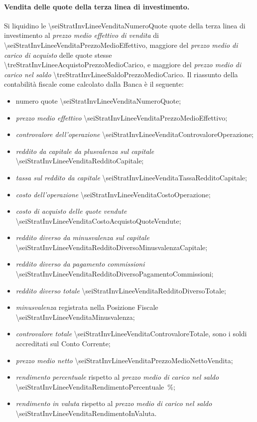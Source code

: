 \documentclass[12pt,a4paper]{article}
\newcommand{\Eur}[1]{\SI{#1}{\text{\euro{}}}}
\begin{document}
\paragraph{Vendita delle quote della terza linea di investimento.}
Si liquidino le \num{\seiStratInvLineeVenditaNumeroQuote} quote della terza linea di investimento al
\emph{prezzo  medio  effettivo  di vendita}  di  \Eur{\seiStratInvLineeVenditaPrezzoMedioEffettivo},
maggiore    del   \emph{prezzo    medio    di    carico   di    acquisto}    delle   quote    stesse
\Eur{\treStratInvLineeAcquistoPrezzoMedioCarico}, e  maggiore del  \emph{prezzo medio di  carico nel
   saldo}  \Eur{\treStratInvLineeSaldoPrezzoMedioCarico}.  Il  riassunto  della contabilità  fiscale
come calcolato dalla Banca è il seguente:
\begin{itemize}
\item numero quote \num{\seiStratInvLineeVenditaNumeroQuote};
\item \emph{prezzo medio effettivo} \Eur{\seiStratInvLineeVenditaPrezzoMedioEffettivo};
\item \emph{controvalore dell'operazione} \Eur{\seiStratInvLineeVenditaControvaloreOperazione};
\item \emph{reddito da capitale da plusvalenza sul capitale} \Eur{\seiStratInvLineeVenditaRedditoCapitale};
\item \emph{tassa sul reddito da capitale} \Eur{\seiStratInvLineeVenditaTassaRedditoCapitale};
\item \emph{costo dell'operazione} \Eur{\seiStratInvLineeVenditaCostoOperazione};
\item \emph{costo di acquisto delle quote vendute} \Eur{\seiStratInvLineeVenditaCostoAcquistoQuoteVendute};
\item \emph{reddito diverso da minusvalenza sul capitale} \Eur{\seiStratInvLineeVenditaRedditoDiversoMinusvalenzaCapitale};
\item \emph{reddito diverso da pagamento commissioni} \Eur{\seiStratInvLineeVenditaRedditoDiversoPagamentoCommissioni};
\item \emph{reddito diverso totale} \Eur{\seiStratInvLineeVenditaRedditoDiversoTotale};
\item \emph{minusvalenza} registrata nella Posizione Fiscale \Eur{\seiStratInvLineeVenditaMinusvalenza};
\item \emph{controvalore totale}  \Eur{\seiStratInvLineeVenditaControvaloreTotale}, sono i soldi
  accreditati sul Conto Corrente;
\item \emph{prezzo medio netto} \Eur{\seiStratInvLineeVenditaPrezzoMedioNettoVendita};
\item  \emph{rendimento   percentuale}  rispetto  al   \emph{prezzo  medio  di  carico   nel  saldo}
  \SI{\seiStratInvLineeVenditaRendimentoPercentuale}{\percent};
\item  \emph{rendimento   in  valuta}  rispetto   al  \emph{prezzo   medio  di  carico   nel  saldo}
  \Eur{\seiStratInvLineeVenditaRendimentoInValuta}.
\end{itemize}
\end{document}
